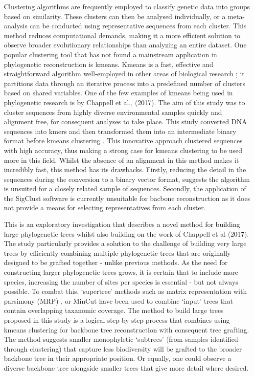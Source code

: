 \documentclass[12pt]{article}
\begin{document}
  Clustering algorithms are frequently employed to classify genetic data into groups based on similarity. These clusters can then be analysed individually, or a meta-analysis can be conducted using representative sequences from each cluster. This method reduces computational demands, making it a more efficient solution to observe broader evolutionary relationships than analyzing an entire dataset. One popular clustering tool that has not found a mainstream application in phylogenetic reconstruction is kmeans. Kmeans is a fast, effective and straightforward algorithm well-employed in other areas of biological research \cite{lu04}; it partitions data through an iterative process into a predefined number of clusters based on shared variables. One of the few examples of kmeans being used in phylogenetic research is by Chappell et al., (2017). The aim of this study was to cluster sequences from highly diverse environmental samples quickly and alignment free, for consequent analyses to take place. This study converted DNA sequences into kmers and then transformed them into an intermediate binary format before kmeans clustering \cite{Chappell2017}. This innovative approach clustered sequences with high accuracy, thus making a strong case for kmeans clustering to be used more in this field. Whilst the absence of an alignment in this method makes it incredibly fast, this method has its drawbacks. Firstly, reducing the detail in the sequences during the conversion to a binary vector format, suggests the algorithm is unsuited for a closely related sample of sequences. Secondly, the application of the SigClust software is currently unsuitable for bacbone reconstruction as it does not provide a means for selecting representatives from each cluster.

  This is an exploratory investigation that describes a novel method for building large phylogenetic trees whilst also building on the work of Chappell et al (2017). The study particularly provides a solution to the challenge of building very large trees by efficiently combining multiple phylogenetic trees that are originally designed to be grafted together - unlike previous methods. As the need for constructing larger phylogenetic trees grows, it is certain that to include more species, increasing the number of sites per species is essential - but not always possible. To combat this,  `supertree' methods such as matrix representation with parsimony (MRP) \cite{MRP}, or MinCut \cite{MinCut} have been used to combine `input' trees that contain overlapping taxanomic coverage. The method to build large trees proposed in this study is a logical step-by-step process that combines using kmeans clustering for backbone tree reconstruction with consequent tree grafting. The method suggests smaller monophyletic `subtrees' (from samples identified through clustering) that capture less biodiversity will be grafted to the broader backbone tree in their appropriate position. Or equally, one could observe a diverse backbone tree alongside smaller trees that give more detail where desired.
  
\end{document}
